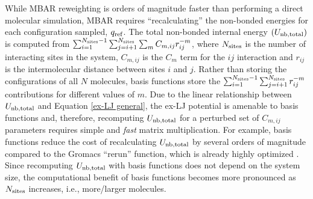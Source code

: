 \documentclass[12pt,a4paper]{article}
\begin{document}

While MBAR reweighting is orders of magnitude faster than performing a direct molecular simulation, MBAR requires ``recalculating'' the non-bonded energies for each configuration sampled, $q_{\rm ref}$. The total non-bonded internal energy $(U_{\rm nb, total})$ is computed from $\sum_{i=1}^{N_{\rm sites}-1} \sum_{j=i+1}^{N_{\rm sites}} \sum_m C_{m,ij} r_{ij}^{-m}$, where $N_{\rm sites}$ is the number of interacting sites in the system, $C_{m,ij}$ is the $C_{m}$ term for the $ij$ interaction and $r_{ij}$ is the intermolecular distance between sites $i$ and $j$. Rather than storing the configurations of all $N$ molecules, basis functions store the $\sum_{i=1}^{N_{\rm sites}-1} \sum_{j=i+1}^{N_{\rm sites}} r_{ij}^{-m}$ contributions for different values of $m$. Due to the linear relationship between $U_{\rm nb, total}$ and Equation \ref{ex-LJ general}, the ex-LJ potential is amenable to basis functions and, therefore, recomputing $U_{\rm nb, total}$ for a perturbed set of $C_{m,ij}$ parameters requires simple and \textit{fast} matrix multiplication. For example, basis functions reduce the cost of recalculating $U_{\rm nb, total}$ by several orders of magnitude compared to the Gromacs ``rerun'' function, which is already highly optimized \cite{GROMACS_2018}. Since recomputing $U_{\rm nb, total}$ with basis functions does not depend on the system size, the computational benefit of basis functions becomes more pronounced as $N_{\rm sites}$ increases, i.e., more/larger molecules.  
\end{document}

